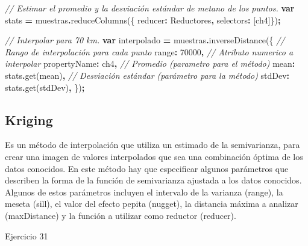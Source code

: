 \documentclass[
  12pt,
  letterpaper,
  twoside]{book}
\newenvironment{Shaded}{\begin{snugshade}}{\end{snugshade}}
\newcommand{\CommentTok}[1]{\textcolor[rgb]{0.56,0.35,0.01}{\textit{#1}}}
\newcommand{\DataTypeTok}[1]{\textcolor[rgb]{0.13,0.29,0.53}{#1}}
\newcommand{\DecValTok}[1]{\textcolor[rgb]{0.00,0.00,0.81}{#1}}
\newcommand{\FunctionTok}[1]{\textcolor[rgb]{0.00,0.00,0.00}{#1}}
\newcommand{\KeywordTok}[1]{\textcolor[rgb]{0.13,0.29,0.53}{\textbf{#1}}}
\newcommand{\NormalTok}[1]{#1}
\newcommand{\OperatorTok}[1]{\textcolor[rgb]{0.81,0.36,0.00}{\textbf{#1}}}
\newcommand{\StringTok}[1]{\textcolor[rgb]{0.31,0.60,0.02}{#1}}
\begin{document}
\begin{Shaded}
\begin{Highlighting}[]
\CommentTok{// Estimar el promedio y la desviación estándar de metano de los puntos.}
\KeywordTok{var}\NormalTok{ stats }\OperatorTok{=}\NormalTok{ muestras}\OperatorTok{.}\FunctionTok{reduceColumns}\NormalTok{(\{}
  \DataTypeTok{reducer}\OperatorTok{:}\NormalTok{ Reductores}\OperatorTok{,}
  \DataTypeTok{selectors}\OperatorTok{:}\NormalTok{ [}\StringTok{\textquotesingle{}ch4\textquotesingle{}}\NormalTok{]\})}\OperatorTok{;}

\CommentTok{// Interpolar para 70 km.}
\KeywordTok{var}\NormalTok{ interpolado }\OperatorTok{=}\NormalTok{ muestras}\OperatorTok{.}\FunctionTok{inverseDistance}\NormalTok{(\{}
  \CommentTok{// Rango de interpolación para cada punto}
  \DataTypeTok{range}\OperatorTok{:} \DecValTok{70000}\OperatorTok{,} 
  \CommentTok{// Atributo numerico a interpolar}
  \DataTypeTok{propertyName}\OperatorTok{:} \StringTok{\textquotesingle{}ch4\textquotesingle{}}\OperatorTok{,} 
  \CommentTok{// Promedio (parametro para el método)}
  \DataTypeTok{mean}\OperatorTok{:}\NormalTok{ stats}\OperatorTok{.}\FunctionTok{get}\NormalTok{(}\StringTok{\textquotesingle{}mean\textquotesingle{}}\NormalTok{)}\OperatorTok{,} 
  \CommentTok{// Desviación estándar (parámetro para la método)}
  \DataTypeTok{stdDev}\OperatorTok{:}\NormalTok{ stats}\OperatorTok{.}\FunctionTok{get}\NormalTok{(}\StringTok{\textquotesingle{}stdDev\textquotesingle{}}\NormalTok{)}\OperatorTok{,} 
\NormalTok{  \})}\OperatorTok{;} 
\end{Highlighting}
\end{Shaded}

\hypertarget{kriging}{%
\subsection{Kriging}\label{kriging}}

Es un método de interpolación que utiliza un estimado de la semivarianza, para crear una imagen de valores interpolados que sea una combinación óptima de los datos conocidos. En este método hay que especificar algunos parámetros que describen la forma de la función de semivarianza ajustada a los datos conocidos. Algunos de estos parámetros incluyen el intervalo de la varianza (range), la meseta (sill), el valor del efecto pepita (nugget), la distancia máxima a analizar (maxDistance) y la función a utilizar como reductor (reducer).

Ejercicio 31
\end{document}
